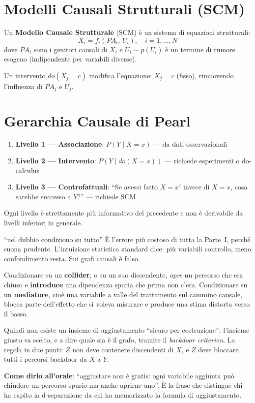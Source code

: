 \section{Modelli Causali Strutturali (SCM)}

\begin{definition}
Un \textbf{Modello Causale Strutturale} (SCM) è un sistema di equazioni strutturali:
\[X_i = f_i(PA_i,\, U_i), \quad i = 1, \ldots, N\]
dove $PA_i$ sono i genitori causali di $X_i$ e $U_i \sim p(U_i)$ è un termine di rumore esogeno (indipendente per variabili diverse).
\end{definition}

Un intervento $do(X_j = c)$ modifica l'equazione: $X_j = c$ (fisso), rimuovendo l'influenza di $PA_j$ e $U_j$.

\section{Gerarchia Causale di Pearl}

\begin{enumerate}
    \item \textbf{Livello 1 — Associazione}: $P(Y \mid X=x)$ — da dati osservazionali
    \item \textbf{Livello 2 — Intervento}: $P(Y \mid do(X=x))$ — richiede esperimenti o do-calculus
    \item \textbf{Livello 3 — Controfattuali}: ``Se avessi fatto $X=x'$ invece di $X=x$, cosa sarebbe successo a $Y$?'' — richiede SCM
\end{enumerate}

Ogni livello è strettamente più informativo del precedente e non è derivabile da livelli inferiori in generale.

\begin{trappola}{``nel dubbio condiziono su tutto''}
È l'errore più costoso di tutta la Parte~I, perché suona prudente. L'intuizione statistica standard dice: più variabili controllo, meno confondimento resta. Sui grafi causali è falso.

Condizionare su un \textbf{collider}, o su un suo discendente, \emph{apre} un percorso che era chiuso e \textbf{introduce} una dipendenza spuria che prima non c'era. Condizionare su un \textbf{mediatore}, cioè una variabile a valle del trattamento sul cammino causale, blocca parte dell'effetto che si voleva misurare e produce una stima distorta verso il basso.

Quindi non esiste un insieme di aggiustamento ``sicuro per costruzione'': l'insieme giusto va scelto, e a dire quale sia è il grafo, tramite il \emph{backdoor criterion}. La regola in due punti: $Z$ non deve contenere discendenti di $X$, e $Z$ deve bloccare tutti i percorsi backdoor da $X$ a $Y$.

\textbf{Come dirlo all'orale}: ``aggiustare non è gratis: ogni variabile aggiunta può chiudere un percorso spurio ma anche aprirne uno''. È la frase che distingue chi ha capito la d-separazione da chi ha memorizzato la formula di aggiustamento.
\end{trappola}

